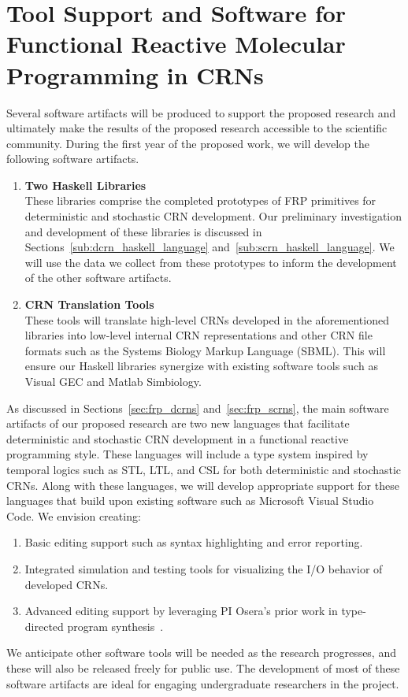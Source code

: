 
\section{Tool Support and Software for Functional Reactive Molecular Programming in CRNs}
\label{sec:software_support}

Several software artifacts will be produced to support the proposed research and ultimately make the results of the proposed research accessible to the scientific community.
During the first year of the proposed work, we will develop the following software artifacts.
\begin{enumerate}
	\item \textbf{Two Haskell Libraries}\\
    These libraries comprise the completed prototypes of FRP primitives for deterministic and stochastic CRN development.
	Our preliminary investigation and development of these libraries is discussed in Sections~\ref{sub:dcrn_haskell_language} and~\ref{sub:scrn_haskell_language}.
	We will use the data we collect from these prototypes to inform the development of the other software artifacts.
	
	\item \textbf{CRN Translation Tools}\\
    These tools will translate high-level CRNs developed in the aforementioned libraries into low-level internal CRN representations and other CRN file formats such as the Systems Biology Markup Language (SBML).
	This will ensure our Haskell libraries synergize with existing software tools such as Visual GEC and Matlab Simbiology.
\end{enumerate}

As discussed in Sections~\ref{sec:frp_dcrns} and~\ref{sec:frp_scrns}, the main software artifacts of our proposed research are two new languages that facilitate deterministic and stochastic CRN development in a functional reactive programming style.
These languages will include a type system inspired by temporal logics such as STL, LTL, and CSL for both deterministic and stochastic CRNs.
Along with these languages, we will develop appropriate support for these languages that build upon existing software such as Microsoft Visual Studio Code.
We envision creating:
\begin{enumerate}
	\item Basic editing support such as syntax highlighting and error reporting.
	\item Integrated simulation and testing tools for visualizing the I/O behavior of developed CRNs.
  \item Advanced editing support by leveraging PI Osera's prior work in type-directed program synthesis~\cite{osera:thesis:2015, osera:pldi:2015, frankle:popl:2015, osera:tyde:2019}.
\end{enumerate}

We anticipate other software tools will be needed as the research progresses, and these will also be released freely for public use.
The development of most of these software artifacts are ideal for engaging undergraduate researchers in the project.
